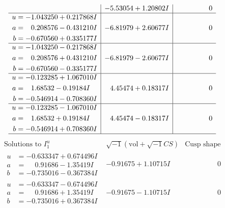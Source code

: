 \documentclass[1p]{elsarticle_modified}
\theoremstyle{definition}
\newcommand{\I}{\sqrt{-1}}
\begin{document}
$$\begin{array}{c|c|c}
 & -5.53054 + 1.20802 I & \phantom{-0.000000 } 0 \\ \hline\begin{aligned}
u &= -1.043250 + 0.217868 I \\
a &= \phantom{-}0.208576 - 0.431210 I \\
b &= -0.670560 + 0.335177 I\end{aligned}
 & -6.81979 + 2.60677 I & \phantom{-0.000000 } 0 \\ \hline\begin{aligned}
u &= -1.043250 - 0.217868 I \\
a &= \phantom{-}0.208576 + 0.431210 I \\
b &= -0.670560 - 0.335177 I\end{aligned}
 & -6.81979 - 2.60677 I & \phantom{-0.000000 } 0 \\ \hline\begin{aligned}
u &= -0.123285 + 1.067010 I \\
a &= \phantom{-}1.68532 - 0.19184 I \\
b &= -0.546914 - 0.708360 I\end{aligned}
 & \phantom{-}4.45474 + 0.18317 I & \phantom{-0.000000 } 0 \\ \hline\begin{aligned}
u &= -0.123285 - 1.067010 I \\
a &= \phantom{-}1.68532 + 0.19184 I \\
b &= -0.546914 + 0.708360 I\end{aligned}
 & \phantom{-}4.45474 - 0.18317 I & \phantom{-0.000000 } 0\\
 \hline 
 \end{array}$$\newpage$$\begin{array}{c|c|c}  
\text{Solutions to }I^u_{1}& \I (\text{vol} + \sqrt{-1}CS) & \text{Cusp shape}\\
 \hline 
\begin{aligned}
u &= -0.633347 + 0.674496 I \\
a &= \phantom{-}0.91686 - 1.35419 I \\
b &= -0.735016 - 0.367384 I\end{aligned}
 & -0.91675 + 1.10715 I & \phantom{-0.000000 } 0 \\ \hline\begin{aligned}
u &= -0.633347 - 0.674496 I \\
a &= \phantom{-}0.91686 + 1.35419 I \\
b &= -0.735016 + 0.367384 I\end{aligned}
 & -0.91675 - 1.10715 I & \phantom{-0.000000 } 0 \\ \hline\begin{aligned}

\end{aligned}
\end{array}$$
\end{document}
